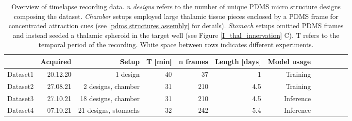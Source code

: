 \begin{table*}[h!]
\begin{adjustbox}{max width=\textwidth,center}
    \begin{tabular}{@{}rrrrrrrrrrrr@{}}
    \toprule
    & Acquired & Setup  & T [min] & n frames & Length [days] & Model usage\\
    \midrule
    \vspace{2mm}
    Dataset1 & 20.12.20 & 1 design  &  40 & 37  & 1   & Training\\
    Dataset2 & 27.08.21 & 2 designs, chamber  &  31 & 210 & 4.5 & Training\\ 
    \vspace{2mm}
    Dataset3 & 27.10.21 & 18 designs, chamber &  31 & 210 & 4.5 & Inference\\
    Dataset4 & 07.10.21 & 21 designs, stomachs &  32 & 242 & 5.4 & Inference\\
    \bottomrule
    \end{tabular}
\end{adjustbox}
\caption[Overview of timelapse recording data]
        {Overview of timelapse recording data.
         \textit{n designs} refers to the number of unique PDMS micro structure
         designs composing the dataset. \textit{Chamber} setups employed large  
         thalamic tissue pieces enclosed by a PDMS frame for concentrated
         attraction cues (see \ref{pdms structures assembly} for details).
         \textit{Stomach} setups omitted PDMS frames and instead seeded a
         thalamic spheroid in the target well (see Figure
         \ref{I_thal_innervation} C). T refers to the temporal period of the
         recording. White space between rows indicates different experiments.}
\label{datasets_table}
\end{table*}


